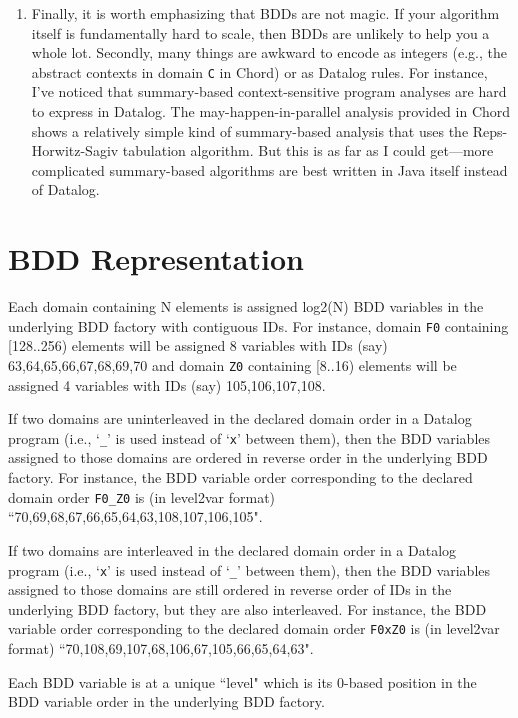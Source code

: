 \begin{enumerate}
\item

Finally, it is worth emphasizing that BDDs are not magic.
If your algorithm itself is fundamentally hard to scale, then BDDs are
unlikely to help you a whole lot.  Secondly, many things are awkward to
encode as integers (e.g., the abstract contexts in domain \verb+C+ 
in Chord) or as Datalog rules.
For instance, I've noticed that summary-based context-sensitive program
analyses are hard to express in Datalog.  The may-happen-in-parallel
analysis provided in Chord shows a relatively simple kind of summary-based
analysis that uses the Reps-Horwitz-Sagiv tabulation algorithm.  But this
is as far as I could get---more complicated summary-based algorithms are
best written in Java itself instead of Datalog.
\end{enumerate}

\section{BDD Representation}
\label{sec:bdd}

Each domain containing N elements is assigned log2(N) BDD variables in the underlying BDD factory with contiguous IDs.
For instance,
domain {\tt F0} containing [128..256) elements will be assigned 8 variables with IDs (say) 63,64,65,66,67,68,69,70 and
domain {\tt Z0} containing [8..16) elements will be assigned 4 variables with IDs (say) 105,106,107,108.

If two domains are uninterleaved in the declared domain order in a Datalog program (i.e., `{\tt \_}' is used instead of `{\tt x}' between them),
then the BDD variables assigned to those domains are ordered in reverse order in the underlying BDD factory.
For instance, the BDD variable order corresponding to the declared domain order {\tt F0\_Z0} is (in level2var format)
``70,69,68,67,66,65,64,63,108,107,106,105".

If two domains are interleaved in the declared domain order in a Datalog program (i.e., `{\tt x}' is used instead of `{\tt \_}' between them),
then the BDD variables assigned to those domains are still ordered in reverse order of IDs in the underlying BDD factory,
but they are also interleaved.
For instance, the BDD variable order corresponding to the declared domain order {\tt F0xZ0} is (in level2var format)
``70,108,69,107,68,106,67,105,66,65,64,63".

Each BDD variable is at a unique ``level" which is its 0-based position in the BDD variable order in the underlying BDD factory.

